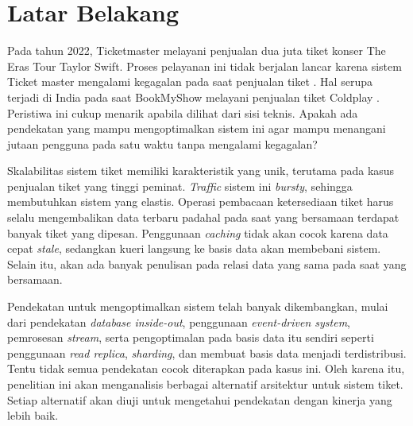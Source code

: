 \section{Latar Belakang}
\label{sec:latar-belakang}

Pada tahun 2022, Ticketmaster melayani penjualan dua juta tiket konser The Eras Tour Taylor Swift. Proses pelayanan ini tidak berjalan lancar karena sistem Ticket master mengalami kegagalan pada saat penjualan tiket \parencite{swiftTicketmaster}. Hal serupa terjadi di India pada saat BookMyShow melayani penjualan tiket Coldplay \parencite{coldplayBookMyShow}. Peristiwa ini cukup menarik apabila dilihat dari sisi teknis. Apakah ada pendekatan yang mampu mengoptimalkan sistem ini agar mampu menangani jutaan pengguna pada satu waktu tanpa mengalami kegagalan?

Skalabilitas sistem tiket memiliki karakteristik yang unik, terutama pada kasus penjualan tiket yang tinggi peminat. \textit{Traffic} sistem ini \textit{bursty}, sehingga membutuhkan sistem yang elastis. Operasi pembacaan ketersediaan tiket harus selalu mengembalikan data terbaru padahal pada saat yang bersamaan terdapat banyak tiket yang dipesan. Penggunaan \textit{caching} tidak akan cocok karena data cepat \textit{stale}, sedangkan kueri langsung ke basis data akan membebani sistem. Selain itu, akan ada banyak penulisan pada relasi data yang sama pada saat yang bersamaan.

Pendekatan untuk mengoptimalkan sistem telah banyak dikembangkan, mulai dari pendekatan \textit{database inside-out}, penggunaan \textit{event-driven system}, pemrosesan \textit{stream}, serta pengoptimalan pada basis data itu sendiri seperti penggunaan \textit{read replica}, \textit{sharding}, dan membuat basis data menjadi terdistribusi. Tentu tidak semua pendekatan cocok diterapkan pada kasus ini. Oleh karena itu, penelitian ini akan menganalisis berbagai alternatif arsitektur untuk sistem tiket. Setiap alternatif akan diuji untuk mengetahui pendekatan dengan kinerja yang lebih baik.
